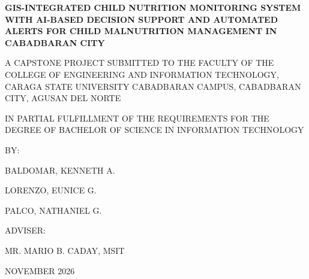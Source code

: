 \documentclass[12pt, a4paper]{report}
\begin{document}
\renewcommand{\thesection}{\thechapter.\arabic{section}}


\begin{titlepage}
    \begin{singlespace}
    \centering
    {\Large\bfseries GIS-INTEGRATED CHILD NUTRITION MONITORING SYSTEM WITH AI-BASED DECISION SUPPORT AND AUTOMATED ALERTS FOR CHILD MALNUTRITION MANAGEMENT IN CABADBARAN CITY \par}
    \vspace{1cm}
    {\normalsize A CAPSTONE PROJECT SUBMITTED TO THE FACULTY OF THE COLLEGE OF ENGINEERING AND INFORMATION TECHNOLOGY, CARAGA STATE UNIVERSITY CABADBARAN CAMPUS, CABADBARAN CITY, AGUSAN DEL NORTE \par}
    \vspace{0.5cm}
    {\normalsize IN PARTIAL FULFILLMENT OF THE REQUIREMENTS FOR THE DEGREE OF BACHELOR OF SCIENCE IN INFORMATION TECHNOLOGY \par}
    \vspace{3cm}
    {\normalsize BY: \par}
    \vspace{0.1cm}
    {\normalsize BALDOMAR, KENNETH A. \par}
    \vspace{0.1cm}
    {\normalsize LORENZO, EUNICE G. \par}
    \vspace{0.1cm}
    {\normalsize PALCO, NATHANIEL G. \par}
    \vspace{2.5cm}
    {\normalsize ADVISER: \par}
    \vspace{0.1cm}
    {\normalsize MR. MARIO B. CADAY, MSIT \par}
    \vspace{2cm}
    {\normalsize NOVEMBER 2026 \par}
    \end{singlespace}
\end{titlepage}
\end{document}
